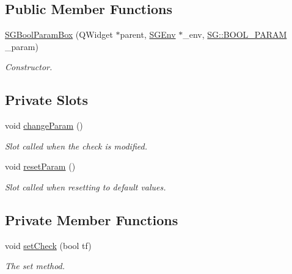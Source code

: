 \subsection*{Public Member Functions}
\begin{DoxyCompactItemize}
\item 
\mbox{\label{classSGBoolParamBox_a7dbba884d15e63ac6302672a0526d689}} 
\hyperlink{classSGBoolParamBox_a7dbba884d15e63ac6302672a0526d689}{S\+G\+Bool\+Param\+Box} (Q\+Widget $\ast$parent, \hyperlink{classSGEnv}{S\+G\+Env} $\ast$\+\_\+env, \hyperlink{namespaceSG_a0b164afe6c58be3386d9e3f6e857b673}{S\+G\+::\+B\+O\+O\+L\+\_\+\+P\+A\+R\+AM} \+\_\+param)
\begin{DoxyCompactList}\small\item\em Constructor. \end{DoxyCompactList}\end{DoxyCompactItemize}
\subsection*{Private Slots}
\begin{DoxyCompactItemize}
\item 
\mbox{\label{classSGBoolParamBox_a1cb3236565d114c247b82ee9b5a344e7}} 
void \hyperlink{classSGBoolParamBox_a1cb3236565d114c247b82ee9b5a344e7}{change\+Param} ()
\begin{DoxyCompactList}\small\item\em Slot called when the check is modified. \end{DoxyCompactList}\item 
\mbox{\label{classSGBoolParamBox_a80b6c9d3e08126850ce592e395cbe6f7}} 
void \hyperlink{classSGBoolParamBox_a80b6c9d3e08126850ce592e395cbe6f7}{reset\+Param} ()
\begin{DoxyCompactList}\small\item\em Slot called when resetting to default values. \end{DoxyCompactList}\end{DoxyCompactItemize}
\subsection*{Private Member Functions}
\begin{DoxyCompactItemize}
\item 
\mbox{\label{classSGBoolParamBox_a325cf165100d961ef33c77001b42270e}} 
void \hyperlink{classSGBoolParamBox_a325cf165100d961ef33c77001b42270e}{set\+Check} (bool tf)
\begin{DoxyCompactList}\small\item\em The set method. \end{DoxyCompactList}\end{DoxyCompactItemize}
